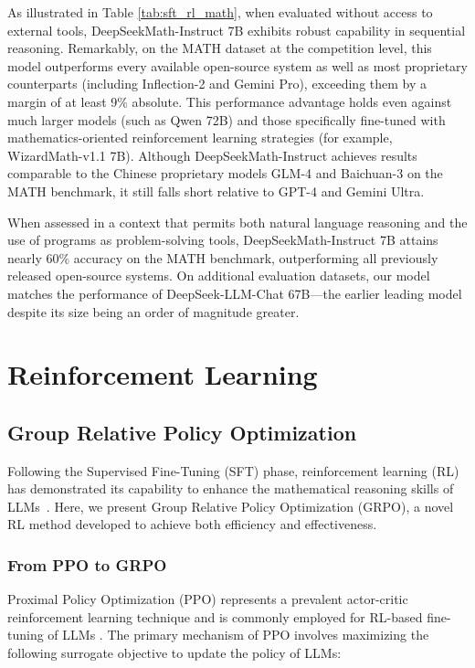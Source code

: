 \begin{itemize}[topsep=0pt]
\begin{itemize}[topsep=0pt]
As illustrated in Table \ref{tab:sft_rl_math}, when evaluated without access to external tools, DeepSeekMath-Instruct 7B exhibits robust capability in sequential reasoning. Remarkably, on the MATH dataset at the competition level, this model outperforms every available open-source system as well as most proprietary counterparts (including Inflection-2 and Gemini Pro), exceeding them by a margin of at least 9\% absolute. This performance advantage holds even against much larger models (such as Qwen 72B) and those specifically fine-tuned with mathematics-oriented reinforcement learning strategies (for example, WizardMath-v1.1 7B). Although DeepSeekMath-Instruct achieves results comparable to the Chinese proprietary models GLM-4 and Baichuan-3 on the MATH benchmark, it still falls short relative to GPT-4 and Gemini Ultra.

When assessed in a context that permits both natural language reasoning and the use of programs as problem-solving tools, DeepSeekMath-Instruct 7B attains nearly 60\% accuracy on the MATH benchmark, outperforming all previously released open-source systems. On additional evaluation datasets, our model matches the performance of DeepSeek-LLM-Chat 67B—the earlier leading model despite its size being an order of magnitude greater.  
\section{Reinforcement Learning}

\subsection{Group Relative Policy Optimization} Following the Supervised Fine-Tuning (SFT) phase, reinforcement learning (RL) has demonstrated its capability to enhance the mathematical reasoning skills of LLMs~\citep{wang2023math,wizardmath}. Here, we present Group Relative Policy Optimization (GRPO), a novel RL method developed to achieve both efficiency and effectiveness.

\subsubsection{From PPO to GRPO} Proximal Policy Optimization (PPO) \citep{schulman2017proximal} represents a prevalent actor-critic reinforcement learning technique and is commonly employed for RL-based fine-tuning of LLMs \citep{ouyang2022training}. The primary mechanism of PPO involves maximizing the following surrogate objective to update the policy of LLMs:


\end{itemize}
\end{itemize}
